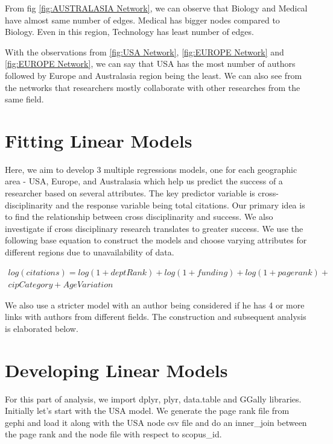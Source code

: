 \documentclass[a4paper,11pt]{article}
\theoremstyle{mytheor}
\begin{document}
From fig \ref{fig:AUSTRALASIA Network}, we can observe that Biology and Medical have almost same number of edges. Medical has bigger nodes compared to Biology. Even in this region, Technology has least number of edges. \newline


With the observations from \ref{fig:USA Network}, \ref{fig:EUROPE Network} and \ref{fig:EUROPE Network}, we can say that USA has the most number of authors followed by Europe and Australasia region being the least. We can also see from the networks that researchers mostly collaborate with other researches from the same field.
\section*{Fitting Linear Models}

Here, we aim to develop 3 multiple regressions models, one for each geographic area - USA, Europe, and Australasia which help us predict the success of a researcher based on several attributes. The key predictor variable is cross-disciplinarity and the response variable being total citations. Our primary idea is to find the relationship between cross disciplinarity and success. We also investigate if cross disciplinary research translates to greater success. We use the following base equation to construct the models and choose varying attributes for different regions due to unavailability of data.

\begin{multline*}
    log(citations) = log(1+deptRank) + log(1+funding) + log(1+pagerank) +\\
    cipCategory + AgeVariation
\end{multline*}
  
We also use a stricter model with an author being considered if he has 4 or more links with authors from different fields. The construction and subsequent analysis is elaborated below.
\section*{Developing Linear Models}

For this part of analysis, we import dplyr, plyr, data.table and GGally libraries. Initially let's start with the USA model. We generate the page rank file from gephi and load it along with the USA node csv file and do an inner\_join between the page rank and the node file with respect to scopus\_id. 
\end{document}
